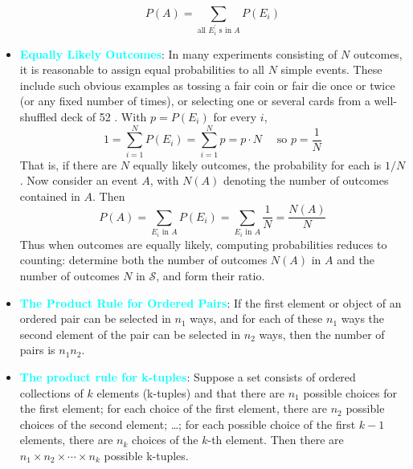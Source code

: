 \documentclass{report}
\begin{document}
\begin{itemize}
$$            P(A)=\sum_{\text {all } E_i^{\prime} \text { s in } A} P\left(E_i\right)
            $$
        \item \textbf{\textcolor{cyan}{Equally Likely Outcomes}}:
            In many experiments consisting of $N$ outcomes, it is reasonable to assign equal probabilities to all $N$ simple events. These include such obvious examples as tossing a fair coin or fair die once or twice (or any fixed number of times), or selecting one or several cards from a well-shuffled deck of 52 . With $p=P\left(E_i\right)$ for every $i$,
            $$
            1=\sum_{i=1}^N P\left(E_i\right)=\sum_{i=1}^N p=p \cdot N \quad \text { so } p=\frac{1}{N}
            $$
            That is, if there are $N$ equally likely outcomes, the probability for each is $1 / N$.
            \bigbreak \noindent 
            Now consider an event $A$, with $N(A)$ denoting the number of outcomes contained in $A$. Then
            $$
            P(A)=\sum_{E_i \text { in } A} P\left(E_i\right)=\sum_{E_i \text { in } A} \frac{1}{N}=\frac{N(A)}{N}
            $$
            Thus when outcomes are equally likely, computing probabilities reduces to counting: determine both the number of outcomes $N(A)$ in $A$ and the number of outcomes $N$ in $\mathcal{S}$, and form their ratio.
        \item \textbf{\textcolor{cyan}{The Product Rule for Ordered Pairs}}:
            If the first element or object of an ordered pair can be selected in $n_1$ ways, and for each of these $n_1$ ways the second element of the pair can be selected in $n_2$ ways, then the number of pairs is $n_1 n_2$.
        \item \textbf{\textcolor{cyan}{The product rule for k-tuples}}:
            Suppose a set consists of ordered collections of \( k \) elements (k-tuples) and that
            there are \( n_1 \) possible choices for the first element; for each choice of the first
            element, there are \( n_2 \) possible choices of the second element; \ldots; for each
            possible choice of the first $k-1$ elements, there are \( n_k \) choices of the \( k \)-th
            element. Then there are \( n_1 \times n_2 \times \cdots \times n_k \) possible k-tuples.


\end{itemize}
\end{document}

